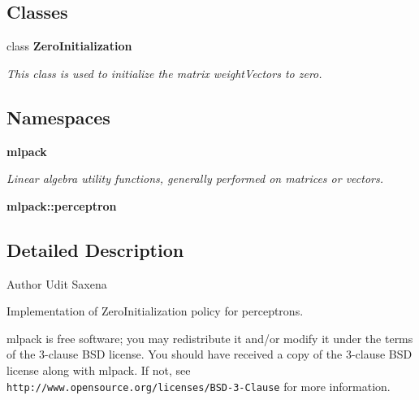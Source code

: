 \subsection*{Classes}
\begin{DoxyCompactItemize}
\item 
class \textbf{ Zero\+Initialization}
\begin{DoxyCompactList}\small\item\em This class is used to initialize the matrix weight\+Vectors to zero. \end{DoxyCompactList}\end{DoxyCompactItemize}
\subsection*{Namespaces}
\begin{DoxyCompactItemize}
\item 
 \textbf{ mlpack}
\begin{DoxyCompactList}\small\item\em Linear algebra utility functions, generally performed on matrices or vectors. \end{DoxyCompactList}\item 
 \textbf{ mlpack\+::perceptron}
\end{DoxyCompactItemize}


\subsection{Detailed Description}
\begin{DoxyAuthor}{Author}
Udit Saxena
\end{DoxyAuthor}
Implementation of Zero\+Initialization policy for perceptrons.

mlpack is free software; you may redistribute it and/or modify it under the terms of the 3-\/clause B\+SD license. You should have received a copy of the 3-\/clause B\+SD license along with mlpack. If not, see {\tt http\+://www.\+opensource.\+org/licenses/\+B\+S\+D-\/3-\/\+Clause} for more information. 